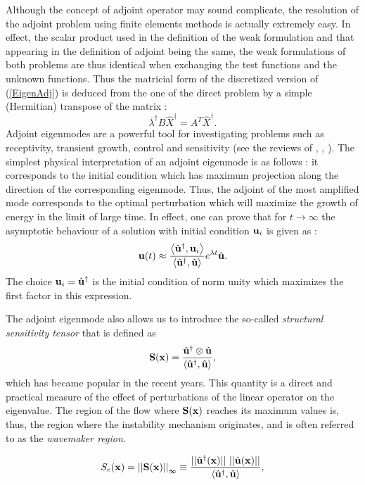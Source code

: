 \documentclass[twocolumn,10pt]{asme2ej}
\newcommand{\be}[1]{ \begin{equation} \label{#1}}
\newcommand{\ee}{\end{equation}}
\begin{document}
Although the concept of adjoint operator may sound complicate, the resolution of the adjoint problem using finite elements methods is actually extremely easy. In effect, the scalar product used in the definition of the weak formulation and that appearing in the definition of adjoint being the same, the weak formulations of both problems are thus identical when exchanging the test functions and the unknown functions. Thus the matricial form of the discretized version of (\ref{EigenAdj}) is deduced from the one of the direct problem by a simple (Hermitian) transpose of the matrix :
\be{Eigen_Adj_matricial}
\overline{\lambda}^\dag B \hat{X}^\dag = A^T \hat{X}^\dag.
\ee
Adjoint eigenmodes are a powerful tool for investigating problems such as receptivity, transient growth, control and sensitivity (see the reviews of \cite{Jmc2005}, \cite{Ps2007}, \cite{LucBott2014}). The simplest physical interpretation of an adjoint eigenmode is as follows : it corresponds to the initial condition which has maximum projection along the direction of the corresponding eigenmode.
Thus, the adjoint of the most amplified mode corresponds to the optimal perturbation which will maximize the growth of energy in the limit of large time. In effect, one can prove that for $t \rightarrow \infty$  the asymptotic behaviour of a solution with initial condition ${\bf u}_i$  is given as :
$$
{\bf u}(t) \approx 
\frac{ \left< \hat{\bf u}^\dag, {\bf u}_i\right>}{\left<\hat{\bf u}^\dag, \hat{\bf u}\right>} 
e^{\lambda t} \hat{\bf u}.
$$
The choice ${\bf u}_i = \hat{\bf u}^\dag$ is the initial condition of norm unity which maximizes the first factor in this expression.

The adjoint eigenmode also allows us to introduce the so-called {\em structural sensitivity tensor } that is defined as 
\be{StructurrTens} 
{\bf{S}}({\bf{x}}) = \frac{ \hat{\bf u}^\dag \otimes \hat{\bf u} }{{\left<\hat{\bf u}^\dag, \hat{\bf u}\right>}},
\ee 
which has became popular in the recent years.
This quantity is a direct and practical measure of the effect of perturbations of the linear operator on the eigenvalue. The region of the flow where ${\bf{S}}({\bf{x}})$ reaches its maximum values is, thus, the region where the instability mechanism originates, and is often referred to as the {\em wavemaker region}.

\be{Structursens} 
S_e({\bf x}) =  {||{\bf{S}}({\bf{x}})||}_\infty \equiv \frac{ ||\hat{\bf u}^\dag({\bf x})|| \,\, ||\hat{\bf u}({\bf x})|| }{{\left<\hat{\bf u}^\dag, \hat{\bf u}\right>}},
\ee 
\end{document}
